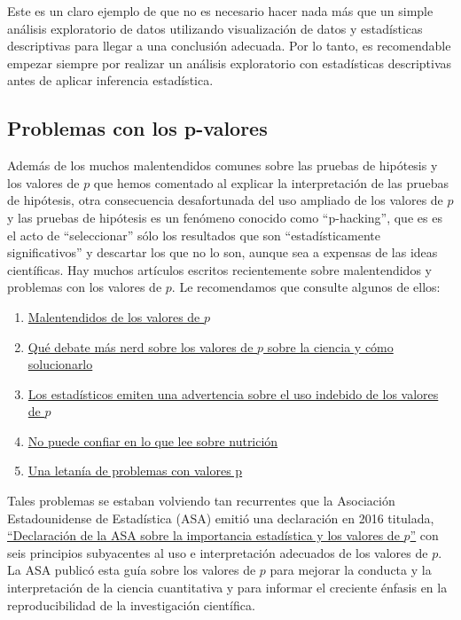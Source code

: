 \documentclass[
]{book}
\providecommand{\tightlist}{%
  \setlength{\itemsep}{0pt}\setlength{\parskip}{0pt}}
\begin{document}
Este es un claro ejemplo de que no es necesario hacer nada más que un simple análisis exploratorio de datos utilizando visualización de datos y estadísticas descriptivas para llegar a una conclusión adecuada. Por lo tanto, es recomendable empezar siempre por realizar un análisis exploratorio con estadísticas descriptivas antes de aplicar inferencia estadística.

\hypertarget{problemas-con-los-p-valores}{%
\subsection{Problemas con los p-valores}\label{problemas-con-los-p-valores}}

Además de los muchos malentendidos comunes sobre las pruebas de hipótesis y los valores de \(p\) que hemos comentado al explicar la interpretación de las pruebas de hipótesis, otra consecuencia desafortunada del uso ampliado de los valores de \(p\) y las pruebas de hipótesis es un fenómeno conocido como ``p-hacking'', que es es el acto de ``seleccionar'' sólo los resultados que son ``estadísticamente significativos'' y descartar los que no lo son, aunque sea a expensas de las ideas científicas. Hay muchos artículos escritos recientemente sobre malentendidos y problemas con los valores de \(p\). Le recomendamos que consulte algunos de ellos:

\begin{enumerate}
\def\labelenumi{\arabic{enumi}.}
\tightlist
\item
  \href{https://en.wikipedia.org/wiki/Misunderstandings_of_p-values}{Malentendidos de los valores de \(p\)}
\item
  \href{https://www.vox.com/science-and-health/2017/7/31/16021654/p-\%20valores-significación-estadística-redefinir-0005}{Qué debate más nerd sobre los valores de \(p\) sobre la ciencia y cómo solucionarlo}
\item
  \href{https://www.nature.com/news/statisticians-issue-warning-over-misuse-of-p-values-1.19503}{Los estadísticos emiten una advertencia sobre el uso indebido de los valores de \(p\)}
\item
  \href{https://fivethirtyeight.com/features/you-cant-trust-what-you-read-about-nutrition/}{No puede confiar en lo que lee sobre nutrición}
\item
  \href{http://www.fharrell.com/post/pval-litany/}{Una letanía de problemas con valores p}
\end{enumerate}

Tales problemas se estaban volviendo tan recurrentes que la Asociación Estadounidense de Estadística (ASA) emitió una declaración en 2016 titulada, \href{https://www.amstat.org/asa/files/pdfs/P-ValueStatement.pdf}{``Declaración de la ASA sobre la importancia estadística y los valores de \(p\)''} con seis principios subyacentes al uso e interpretación adecuados de los valores de \(p\). La ASA publicó esta guía sobre los valores de \(p\) para mejorar la conducta y la interpretación de la ciencia cuantitativa y para informar el creciente énfasis en la reproducibilidad de la investigación científica.
\end{document}
